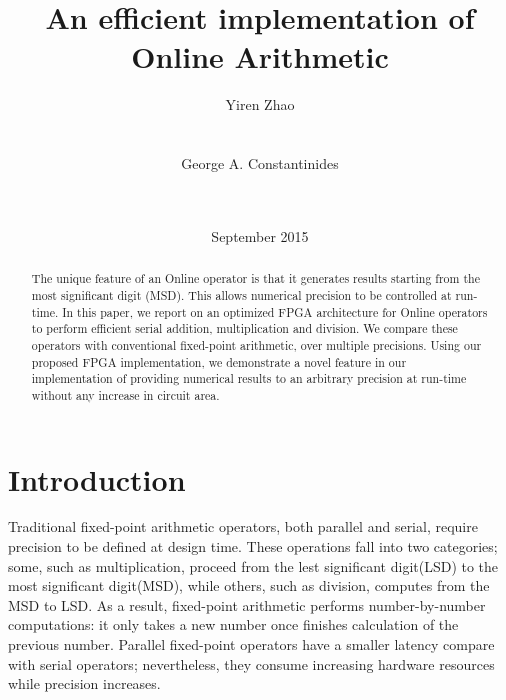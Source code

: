 \documentclass{sig-alternate}
\begin{document}
	\title{An efficient implementation of Online Arithmetic}
	
	
	\author{
		\alignauthor
		Yiren Zhao\\
		\\
		\\
		\alignauthor
		George A. Constantinides\\
		\\
		\\
	}
	\date{September 2015}
	
	\maketitle
	
	\begin{abstract}
		The unique feature of an Online operator is that it generates results starting from the most significant digit (MSD). This allows numerical precision to be controlled at run-time. In this paper, we report on an optimized FPGA architecture for Online operators to perform efficient serial addition, multiplication and division. We compare these operators with conventional fixed-point arithmetic, over multiple precisions. Using our proposed FPGA implementation, we demonstrate a novel feature in our implementation of providing numerical results to an arbitrary precision at run-time without any increase in circuit area. 
	\end{abstract}
	
	
	\section{Introduction}
    Traditional fixed-point arithmetic operators, both parallel and serial, require precision to be defined at design time. These operations fall into two categories; some, such as multiplication, proceed from the lest significant digit(LSD) to the most significant digit(MSD), while others, such as division, computes from the MSD to LSD. As a result, fixed-point arithmetic performs number-by-number computations: it only takes a new number once finishes calculation of the previous number. Parallel fixed-point operators have a smaller latency compare with serial operators; nevertheless, they consume increasing hardware resources while precision increases. 
	
\end{document}
